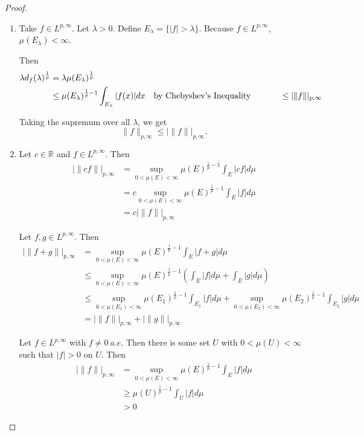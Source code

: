 \documentclass[a4paper]{article}
\newcommand{\R}{\mathbb{R}}
\begin{document}
\begin{enumerate}
\begin{proof}
\begin{enumerate}
        \item
          Take $f \in L^{p,\infty}$. Let $\lambda>0$. Define $E_\lambda = \{ |f| > \lambda \}$. Because $f \in L^{p,\infty}$, $\mu(E_\lambda) <
          \infty$.

          Then
          \begin{align*}
            \lambda d_f(\lambda)^{\frac{1}{p}} &= \lambda \mu(E_\lambda)^{\frac{1}{p}} \\
            &\leq \mu(E_\lambda)^{\frac{1}{p} - 1} \int_{E_\lambda}^{} |f(x)| dx \quad \parbox{5cm}{by Chebyshev's Inequality}
            &\leq | \|f\| |_{p,\infty}
          \end{align*}

          Taking the supremum over all $\lambda$, we get
          \[ \|f\|_{p,\infty} \leq | \|f\| |_{p,\infty} .\]

        \item
          Let $c \in \R$ and $f \in L^{p,\infty}$. Then
          \begin{align*}
            | \| cf \| |_{p,\infty} &= \sup_{0 < \mu(E) < \infty} \mu(E)^{\frac{1}{p}-1} \int_{E}^{} |cf| d\mu \\
            &= c \sup_{0 < \mu(E) < \infty} \mu(E)^{\frac{1}{p} - 1} \int_{E}^{} |f| d\mu \\
            &= c | \| f \| |_{p,\infty}
          \end{align*}

          Let $f,g \in L^{p,\infty}$. Then
          \begin{align*}
            | \| f+g \| |_{p,\infty} &= \sup_{0 < \mu(E) < \infty} \mu(E)^{\frac{1}{p} - 1} \int_{E}^{} |f+g| d\mu \\
            &\leq \sup_{0 < \mu(E) < \infty} \mu(E)^{\frac{1}{p} - 1} \left( \int_{E}^{} |f| d\mu + \int_{E}^{} |g| d\mu \right) \\
            &\leq \sup_{0 < \mu(E_1) < \infty} \mu(E_1)^{\frac{1}{p} - 1} \int_{E_1}^{} |f| d\mu + \sup_{0 < \mu(E_2) < \infty}
            \mu(E_2)^{\frac{1}{p} - 1} \int_{E_2}^{} |g| d\mu \\
            &= | \|f\| |_{p,\infty} + | \|g\| |_{p,\infty}
          \end{align*}

          Let $f \in L^{p,\infty}$ with $f \neq 0 \ a.e.$ Then there is some set $U$ with $0 < \mu(U) < \infty$ such that $|f|>0$ on $U$. Then
          \begin{align*}
            | \| f \| |_{p,\infty} &= \sup_{0 < \mu(E) < \infty} \mu(E)^{\frac{1}{p}-1} \int_{E}^{} |f| d\mu \\
            &\geq \mu(U)^{\frac{1}{p}-1} \int_{U}^{} |f| d\mu \\
            &>0
          \end{align*}


\end{enumerate}
\end{proof}
\end{enumerate}
\end{document}
